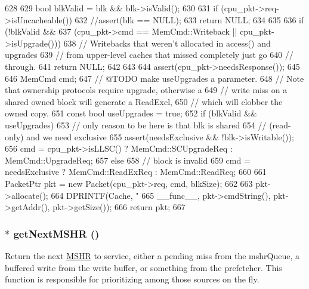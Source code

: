 \begin{DoxyCode}
628 {
629     bool blkValid = blk && blk->isValid();
630 
631     if (cpu_pkt->req->isUncacheable()) {
632         //assert(blk == NULL);
633         return NULL;
634     }
635 
636     if (!blkValid &&
637         (cpu_pkt->cmd == MemCmd::Writeback || cpu_pkt->isUpgrade())) {
638         // Writebacks that weren't allocated in access() and upgrades
639         // from upper-level caches that missed completely just go
640         // through.
641         return NULL;
642     }
643 
644     assert(cpu_pkt->needsResponse());
645 
646     MemCmd cmd;
647     // @TODO make useUpgrades a parameter.
648     // Note that ownership protocols require upgrade, otherwise a
649     // write miss on a shared owned block will generate a ReadExcl,
650     // which will clobber the owned copy.
651     const bool useUpgrades = true;
652     if (blkValid && useUpgrades) {
653         // only reason to be here is that blk is shared
654         // (read-only) and we need exclusive
655         assert(needsExclusive && !blk->isWritable());
656         cmd = cpu_pkt->isLLSC() ? MemCmd::SCUpgradeReq : MemCmd::UpgradeReq;
657     } else {
658         // block is invalid
659         cmd = needsExclusive ? MemCmd::ReadExReq : MemCmd::ReadReq;
660     }
661     PacketPtr pkt = new Packet(cpu_pkt->req, cmd, blkSize);
662 
663     pkt->allocate();
664     DPRINTF(Cache, "%
665             __func__, pkt->cmdString(), pkt->getAddr(), pkt->getSize());
666     return pkt;
667 }
\end{DoxyCode}
\hypertarget{classCache_a3ce02537ee4a8918300802fda9b82b47}{
\subsubsection[{getNextMSHR}]{ $\ast$ getNextMSHR ()}}
\label{classCache_a3ce02537ee4a8918300802fda9b82b47}
Return the next \hyperlink{classMSHR}{MSHR} to service, either a pending miss from the mshrQueue, a buffered write from the write buffer, or something from the prefetcher. This function is responsible for prioritizing among those sources on the fly. 


